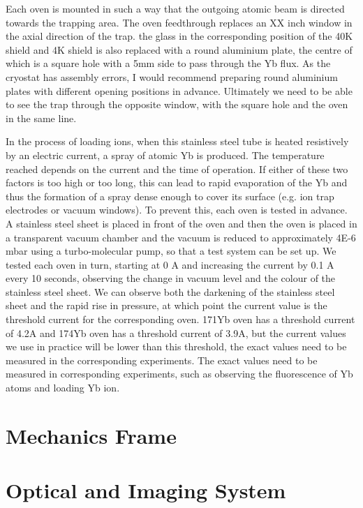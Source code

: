 Each oven is mounted in such a way that the outgoing atomic beam is directed towards the trapping area. The oven feedthrough replaces an XX inch window in the axial direction of the trap. the glass in the corresponding position of the 40K shield and 4K shield is also replaced with a round aluminium plate, the centre of which is a square hole with a 5mm side to pass through the Yb flux. As the cryostat has assembly errors, I would recommend preparing round aluminium plates with different opening positions in advance. Ultimately we need to be able to see the trap through the opposite window, with the square hole and the oven in the same line.

In the process of loading ions, when this stainless steel tube is heated resistively by an electric current, a spray of atomic Yb is produced. The temperature reached depends on the current and the time of operation. If either of these two factors is too high or too long, this can lead to rapid evaporation of the Yb and thus the formation of a spray dense enough to cover its surface (e.g. ion trap electrodes or vacuum windows). To prevent this, each oven is tested in advance. A stainless steel sheet is placed in front of the oven and then the oven is placed in a transparent vacuum chamber and the vacuum is reduced to approximately 4E-6 mbar using a turbo-molecular pump, so that a test system can be set up. We tested each oven in turn, starting at 0 A and increasing the current by 0.1 A every 10 seconds, observing the change in vacuum level and the colour of the stainless steel sheet. We can observe both the darkening of the stainless steel sheet and the rapid rise in pressure, at which point the current value is the threshold current for the corresponding oven. 171Yb oven has a threshold current of 4.2A and 174Yb oven has a threshold current of 3.9A, but the current values we use in practice will be lower than this threshold, the exact values need to be measured in the corresponding experiments. The exact values need to be measured in corresponding experiments, such as observing the fluorescence of Yb atoms and loading Yb ion.



\section{Mechanics Frame}



\section{Optical and Imaging System}

